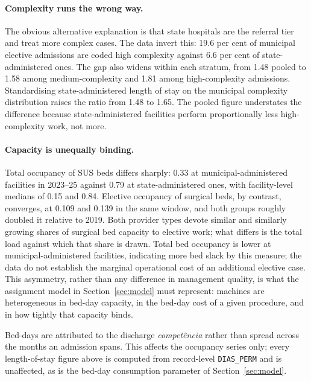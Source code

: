 \paragraph{Complexity runs the wrong way.} The obvious alternative explanation
is that state hospitals are the referral tier and treat more complex cases. The
data invert this: 19.6 per cent of municipal elective admissions are coded high
complexity against 6.6 per cent of state-administered ones. The gap also widens
within each stratum, from 1.48 pooled to 1.58 among medium-complexity and 1.81
among high-complexity admissions. Standardising state-administered length of
stay on the municipal complexity distribution raises the ratio from 1.48 to
1.65. The pooled figure understates the difference because state-administered
facilities perform proportionally less high-complexity work, not more.

\paragraph{Capacity is unequally binding.} Total occupancy of SUS beds differs
sharply: 0.33 at municipal-administered facilities in 2023--25 against 0.79 at
state-administered ones, with facility-level medians of 0.15 and 0.84. Elective
occupancy of surgical beds, by contrast, converges, at 0.109 and 0.139 in the
same window, and both groups roughly doubled it relative to 2019. Both provider
types devote similar and similarly growing shares of surgical bed capacity to
elective work; what differs is the total load against which that share is drawn.
Total bed occupancy is lower at municipal-administered facilities, indicating more bed slack by this measure; the data do not establish the marginal operational cost of an additional elective case. This asymmetry, rather
than any difference in management quality, is what the assignment model in
Section~\ref{sec:model} must represent: machines are heterogeneous in bed-day capacity, in
the bed-day cost of a given procedure, and in how tightly that capacity binds.

Bed-days are attributed to the discharge \emph{compet\^encia} rather than spread
across the months an admission spans. This affects the occupancy series only;
every length-of-stay figure above is computed from record-level
\texttt{DIAS\_PERM} and is unaffected, as is the bed-day consumption parameter of
Section~\ref{sec:model}.

